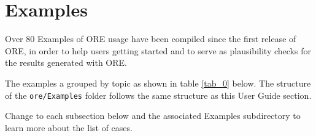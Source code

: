 \section{Examples}\label{sec:examples}

Over 80 Examples of ORE usage have been compiled since the first release of ORE, in order to help
users getting started and to serve as plausibility checks for the results generated with ORE.

The examples a grouped by topic as shown in table \ref{tab_0} below. The structure of the
{\tt ore/Examples} folder follows the same structure as this User Guide section. 

Change to each subsection below and the associated Examples subdirectory to learn more about the list
of cases.

